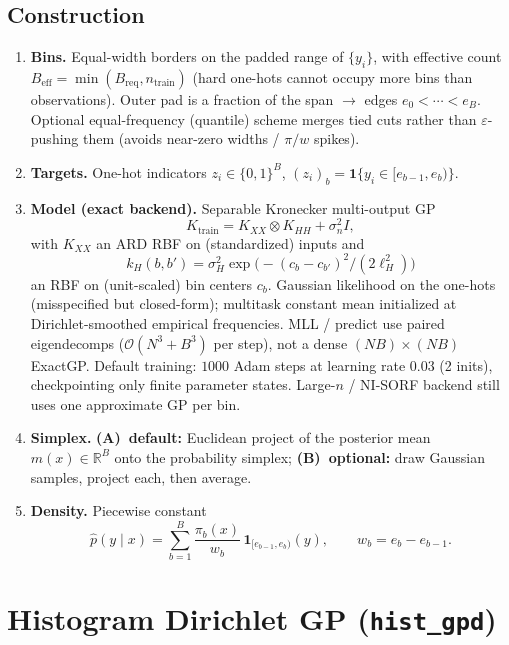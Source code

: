 \documentclass[11pt,a4paper]{article}
\newcommand{\R}{\mathbb{R}}
\theoremstyle{definition}
\begin{document}
\subsection{Construction}

\begin{enumerate}[leftmargin=1.4em]
\item \textbf{Bins.} Equal-width borders on the padded range of $\{y_i\}$, with
  effective count
  $B_{\mathrm{eff}}=\min(B_{\mathrm{req}},n_{\mathrm{train}})$
  (hard one-hots cannot occupy more bins than observations).
  Outer pad is a fraction of the span $\to$ edges $e_0<\cdots<e_B$.
  Optional equal-frequency (quantile) scheme merges tied cuts rather than
  $\varepsilon$-pushing them (avoids near-zero widths / $\pi/w$ spikes).
\item \textbf{Targets.} One-hot indicators
  $z_i\in\{0,1\}^B$, $(z_i)_b=\mathbf{1}\{y_i\in[e_{b-1},e_b)\}$.
\item \textbf{Model (exact backend).} Separable Kronecker multi-output GP
  \[
    K_{\mathrm{train}}
    =
    K_{XX}\otimes K_{HH}
    +
    \sigma_n^2 I,
  \]
  with $K_{XX}$ an ARD RBF on (standardized) inputs and
  \[
    k_H(b,b')
    =
    \sigma_H^2
    \exp\!\bigl(-(c_b-c_{b'})^2/(2\ell_H^2)\bigr)
  \]
  an RBF on (unit-scaled) bin centers $c_b$.
  Gaussian likelihood on the one-hots (misspecified but closed-form);
  multitask constant mean initialized at Dirichlet-smoothed empirical
  frequencies.
  MLL / predict use paired eigendecomps ($\mathcal{O}(N^3+B^3)$ per step),
  not a dense $(NB)\times(NB)$ ExactGP.
  Default training: $1000$ Adam steps at learning rate $0.03$ (2 inits),
  checkpointing only finite parameter states.
  Large-$n$ / NI-SORF backend still uses one approximate GP per bin.
\item \textbf{Simplex.}
  \textbf{(A)~default:} Euclidean project of the posterior mean
  $m(x)\in\R^B$ onto the probability simplex;
  \textbf{(B)~optional:} draw Gaussian samples, project each, then average.
\item \textbf{Density.} Piecewise constant
  \[
    \hat p(y\mid x)
    =
    \sum_{b=1}^{B}
    \frac{\pi_b(x)}{w_b}\,
    \mathbf{1}_{[e_{b-1},e_b)}(y),
    \qquad
    w_b=e_b-e_{b-1}.
  \]
\end{enumerate}

\section{Histogram Dirichlet GP (\texttt{hist\_gpd})}
\label{sec:hist-gpd}
\end{document}
